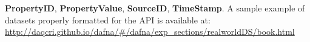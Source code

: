 \documentclass[a4paper,10pt]{scrartcl}
\begin{document}
\begin{enumerate}
\begin{enumerate}
 \textbf{PropertyID}, \textbf{PropertyValue}, \textbf{SourceID}, \textbf{TimeStamp}. 
 A sample example of datasets properly formatted for the API is available at:
 \href{http://daqcri.github.io/dafna/\#/dafna/exp\_sections/realworldDS/book.html}{\small{http://daqcri.github.io/dafna/\#/dafna/exp\_sections/realworldDS/book.html}}
\end{enumerate}
  

\end{enumerate}
\end{document}
